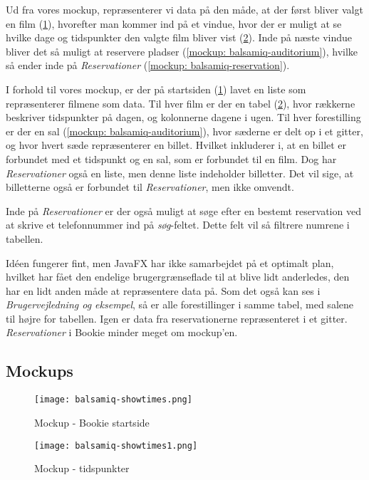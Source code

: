 Ud fra vores mockup, repræsenterer vi data på den måde, at der først bliver valgt en film (\ref{mockup: balsamiq-showtimes}), hvorefter man kommer ind på et vindue, hvor der er muligt at se hvilke dage og tidspunkter den valgte film bliver vist (\ref{mockup: balsamiq-showtimes1}). Inde på næste vindue bliver det så muligt at reservere pladser (\ref{mockup: balsamiq-auditorium}), hvilke så ender inde på \textit{Reservationer} (\ref{mockup: balsamiq-reservation}).

I forhold til vores mockup, er der på startsiden (\ref{mockup: balsamiq-showtimes}) lavet en liste som repræsenterer filmene som data. Til hver film er der en tabel (\ref{mockup: balsamiq-showtimes1}), hvor rækkerne beskriver tidspunkter på dagen, og kolonnerne dagene i ugen. Til hver forestilling er der en sal (\ref{mockup: balsamiq-auditorium}), hvor sæderne er delt op i et gitter, og hvor hvert sæde repræsenterer en billet. Hvilket inkluderer i, at en billet er forbundet med et tidspunkt og en sal, som er forbundet til en film. Dog har \textit{Reservationer} også en liste, men denne liste indeholder billetter. Det vil sige, at billetterne også er forbundet til \textit{Reservationer}, men ikke omvendt.

Inde på \textit{Reservationer} er der også muligt at søge efter en bestemt reservation ved at skrive et telefonnummer ind på \textit{søg}-feltet. Dette felt vil så filtrere numrene i tabellen.

Idéen fungerer fint, men JavaFX har ikke samarbejdet på et optimalt plan, hvilket har fået den endelige brugergrænseflade til at blive lidt anderledes, den har en lidt anden måde at repræsentere data på. Som det også kan ses i \textit{Brugervejledning og eksempel}, så er alle forestillinger i samme tabel, med salene til højre for tabellen. Igen er data fra reservationerne repræsenteret i et gitter. \textit{Reservationer} i Bookie minder meget om mockup'en. 

\subsection{Mockups}

\begin{figure}[h]
  \centering
  \texttt{[image: balsamiq-showtimes.png]}
  \caption{Mockup - Bookie startside}
  \label{mockup: balsamiq-showtimes}
\end{figure}

\begin{figure}[h]
  \centering
  \texttt{[image: balsamiq-showtimes1.png]}
  \caption{Mockup - tidspunkter}
  \label{mockup: balsamiq-showtimes1}
\end{figure}

